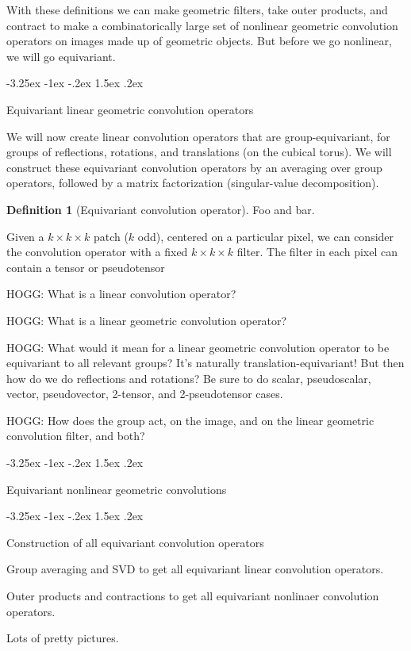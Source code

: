 \documentclass{article}
\makeatletter
\theoremstyle{definition}
\newtheorem{definition}{Definition}
\renewcommand\section{\@startsection {section}{1}{\z@}%
  {-3.25ex \@plus -1ex \@minus -.2ex}%
  {1.5ex \@plus .2ex}%
  {\raggedright\normalfont\large\bfseries}}
\makeatother
\begin{document}
With these definitions we can make geometric filters, take outer products, and contract to make a combinatorically large set of nonlinear geometric convolution operators on images made up of geometric objects.
But before we go nonlinear, we will go equivariant.

\section{Equivariant linear geometric convolution operators}

We will now create linear convolution operators that are group-equivariant, for groups of reflections, rotations, and translations (on the cubical torus).
We will construct these equivariant convolution operators by an averaging over group operators, followed by a matrix factorization (singular-value decomposition).

\begin{definition}[Equivariant convolution operator]
Foo and bar.
\end{definition}

Given a $k\times k \times k$ patch ($k$ odd), centered on a particular pixel, we can consider the convolution operator with a fixed $k\times k \times k$ filter. The filter in each pixel can contain a tensor or pseudotensor

HOGG: What is a linear convolution operator?

HOGG: What is a linear geometric convolution operator?

HOGG: What would it mean for a linear geometric convolution operator to be equivariant to all relevant groups?
It's naturally translation-equivariant!
But then how do we do reflections and rotations?
Be sure to do scalar, pseudoscalar, vector, pseudovector, 2-tensor, and 2-pseudotensor cases.

HOGG: How does the group act, on the image, and on the linear geometric convolution filter, and both?

\section{Equivariant nonlinear geometric convolutions}

\section{Construction of all equivariant convolution operators}

Group averaging and SVD to get all equivariant linear convolution operators.

Outer products and contractions to get all equivariant nonlinaer convolution operators.

Lots of pretty pictures.
\end{document}
